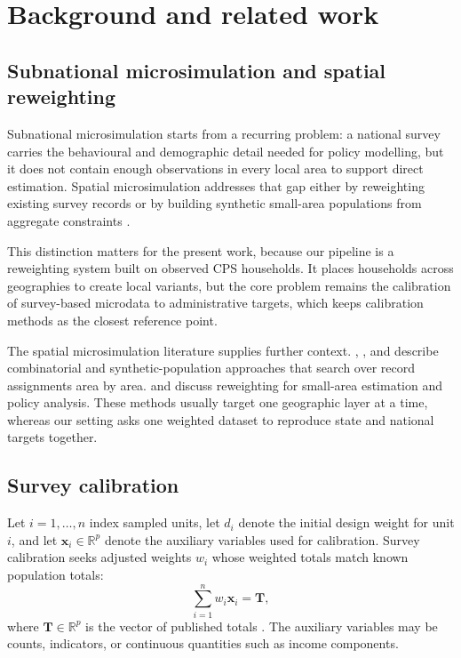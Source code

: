 \section{Background and related work}
\label{sec:background}

\subsection{Subnational microsimulation and spatial reweighting}

Subnational microsimulation starts from a recurring problem: a national survey carries the
behavioural and demographic detail needed for policy modelling, but it does not contain enough
observations in every local area to support direct estimation. Spatial microsimulation addresses
that gap either by reweighting existing survey records or by building synthetic small-area
populations from aggregate constraints \citep{tanton2014review, odonoghue2014review}.

This distinction matters for the present work, because our pipeline is a reweighting system built on
observed CPS households. It places households across geographies to create local variants, but the
core problem remains the calibration of survey-based microdata to administrative targets, which keeps
calibration methods as the closest reference point.

The spatial microsimulation literature supplies further context. \citet{williamson1998},
\citet{huang2001}, and \citet{harland2012} describe combinatorial and synthetic-population
approaches that search over record assignments area by area. \citet{tanton2011} and
\citet{lovelace2016} discuss reweighting for small-area estimation and policy analysis. These
methods usually target one geographic layer at a time, whereas our setting asks one weighted dataset
to reproduce state and national targets together.

\subsection{Survey calibration}

Let $i = 1, \ldots, n$ index sampled units, let $d_i$ denote the initial design weight for unit $i$,
and let $\mathbf{x}_i \in \mathbb{R}^p$ denote the auxiliary variables used for calibration. Survey
calibration seeks adjusted weights $w_i$ whose weighted totals match known population totals:
\begin{equation}
    \sum_{i=1}^{n} w_i \mathbf{x}_i = \mathbf{T},
    \label{eq:calibration_constraint}
\end{equation}
where $\mathbf{T} \in \mathbb{R}^p$ is the vector of published totals \citep{deville1992,
sarndal2007}. The auxiliary variables may be counts, indicators, or continuous quantities such as
income components.

